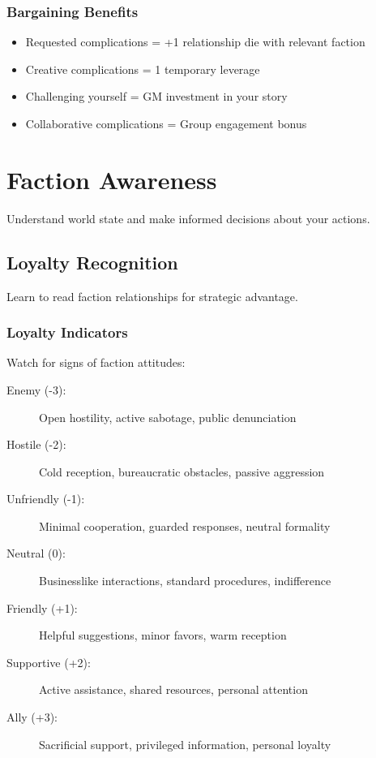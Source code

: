 \subsubsection{Bargaining Benefits}

\begin{itemize}
\item Requested complications = +1 relationship die with relevant faction
\item Creative complications = 1 temporary leverage
\item Challenging yourself = GM investment in your story
\item Collaborative complications = Group engagement bonus
\end{itemize}

\section{Faction Awareness}

Understand world state and make informed decisions about your actions.

\subsection{Loyalty Recognition}

Learn to read faction relationships for strategic advantage.

\subsubsection{Loyalty Indicators}

Watch for signs of faction attitudes:
\begin{description}
\item[Enemy (-3):] Open hostility, active sabotage, public denunciation
\item[Hostile (-2):] Cold reception, bureaucratic obstacles, passive aggression
\item[Unfriendly (-1):] Minimal cooperation, guarded responses, neutral formality
\item[Neutral (0):] Businesslike interactions, standard procedures, indifference
\item[Friendly (+1):] Helpful suggestions, minor favors, warm reception
\item[Supportive (+2):] Active assistance, shared resources, personal attention
\item[Ally (+3):] Sacrificial support, privileged information, personal loyalty
\end{description}

